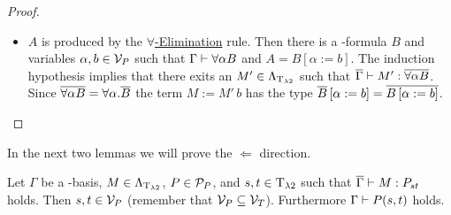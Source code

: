 \begin{proof}
\begin{itemize}
	\item[] $A$ is produced by the \underline{$\forall$-Elimination} rule. Then there is a \SysP-formula $B$ and variables $\alpha,b\in\mathcal{V}_P$ such that $\Gamma\vdash\forall\alpha B$ and $A=B\left[\alpha:=b\right]$. The induction hypothesis implies that there exits an $M'\in\Lambda_{\text{T}_{\lambda2}}$ such that $\overline{\Gamma}\vdash M':\overline{\forall\alpha B}$. Since $\overline{\forall\alpha B}=\forall\alpha.\overline{B}$ the term $M:=M'\,b$ has the type $\overline{B}\left[\alpha:=b\right]=\overline{B\left[\alpha:=b\right]}$.
\end{itemize}
\end{proof}

In the next two lemmas we will prove the $\Leftarrow$ direction.

\begin{lemma}\label{lem.4.3}
Let $\Gamma$ be a \SysP-basis, $M\in\Lambda_{\text{T}_{\lambda2}}$, $P\in\mathcal{P}_P$, and $\predTFst,\predTSnd\in\lambdaTypes$ such that $\trans{\Gamma}\lambdaModels M:\code{P}{\predTFst}{\predTSnd}$ holds.
Then $\predTFst, \predTSnd\in\VarP$ (remember that $\mathcal{V}_P\subseteq\mathcal{V}_T$). Furthermore $\Gamma\PModels P(\predTFst,\predTSnd)$ holds.
\end{lemma}
